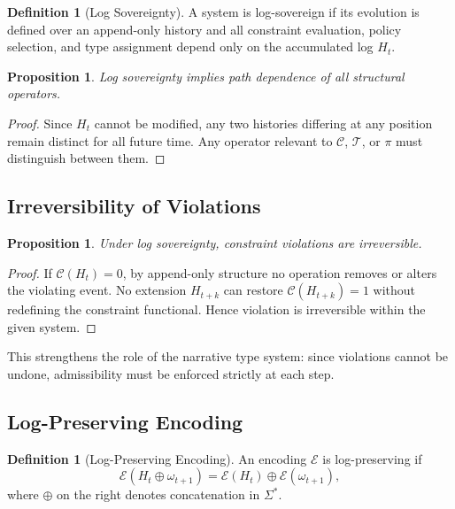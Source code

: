 \documentclass[12pt, a4paper]{article}
\theoremstyle{plain}
\newtheorem{proposition}[theorem]{Proposition}
\theoremstyle{definition}
\newtheorem{definition}[theorem]{Definition}
\theoremstyle{remark}
\begin{document}
\begin{definition}[Log Sovereignty]
A system is log-sovereign if its evolution is defined over an append-only history and all constraint evaluation, policy selection, and type assignment depend only on the accumulated log $H_t$.
\end{definition}

\begin{proposition}
Log sovereignty implies path dependence of all structural operators.
\end{proposition}

\begin{proof}
Since $H_t$ cannot be modified, any two histories differing at any position remain distinct for all future time. Any operator relevant to $\mathcal{C}$, $\mathcal{T}$, or $\pi$ must distinguish between them.
\end{proof}

\subsection{Irreversibility of Violations}

\begin{proposition}
Under log sovereignty, constraint violations are irreversible.
\end{proposition}

\begin{proof}
If $\mathcal{C}(H_t) = 0$, by append-only structure no operation removes or alters the violating event. No extension $H_{t+k}$ can restore $\mathcal{C}(H_{t+k}) = 1$ without redefining the constraint functional. Hence violation is irreversible within the given system.
\end{proof}

This strengthens the role of the narrative type system: since violations cannot be undone, admissibility must be enforced strictly at each step.

\subsection{Log-Preserving Encoding}

\begin{definition}[Log-Preserving Encoding]
An encoding $\mathcal{E}$ is log-preserving if
\[
\mathcal{E}(H_t \oplus \omega_{t+1}) = \mathcal{E}(H_t) \oplus \mathcal{E}(\omega_{t+1}),
\]
where $\oplus$ on the right denotes concatenation in $\Sigma^*$.
\end{definition}
\end{document}
